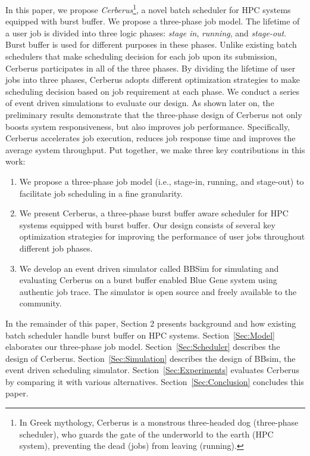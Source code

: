 In this paper, we propose \textit{Cerberus}\footnote{In Greek mythology,
Cerberus is a monstrous three-headed dog (three-phase scheduler),
who guards the gate of the underworld to the earth (HPC system),
preventing the dead (jobs) from leaving (running).},
a novel batch scheduler for HPC systems equipped with burst buffer. 
We propose a three-phase job model.
The lifetime of a user job is divided into three logic phases:
\textit{stage in}, \textit{running}, and \textit{stage-out}.
Burst buffer is used for different purposes in these phases.
Unlike existing batch schedulers that make scheduling decision for each job upon its submission,
Cerberus participates in all of the three phases.
By dividing the lifetime of user jobs into three phases,
Cerberus adopts different optimization strategies to 
make scheduling decision based on job requirement at each phase.
We conduct a series of event driven simulations to evaluate our design. 
As shown later on,
the preliminary results demonstrate that the three-phase design of Cerberus 
not only boosts system responsiveness, but also improves job performance. 
Specifically,
Cerberus accelerates job execution, reduces job response time 
and improves the average system throughput.
Put together, we make three key contributions in this work:
\begin{enumerate}
        \item    We propose a three-phase job model (i.e., stage-in, running, and stage-out)
                to facilitate job scheduling in a fine granularity.
        \item    We present Cerberus, a three-phase burst buffer aware scheduler
                for HPC systems equipped with burst buffer.
                Our design consists of several key optimization strategies for
                improving the performance of user jobs throughout different job phases.
        \item    We develop an event driven simulator called BBSim
                for simulating and evaluating Cerberus on a burst buffer enabled Blue Gene system
                using authentic job trace. The simulator is open source and
                freely available to the community.
\end{enumerate}


In the remainder of this paper, Section 2 presents background and 
how existing batch scheduler handle burst buffer on HPC systems.
Section~\ref{Sec:Model} elaborates our three-phase job model.
Section~\ref{Sec:Scheduler} describes the design of Cerberus.
Section~\ref{Sec:Simulation} describes the design of BBsim, the event driven scheduling simulator.
Section~\ref{Sec:Experiments} evaluates Cerberus by comparing it with various alternatives.
Section~\ref{Sec:Conclusion} concludes this paper.

